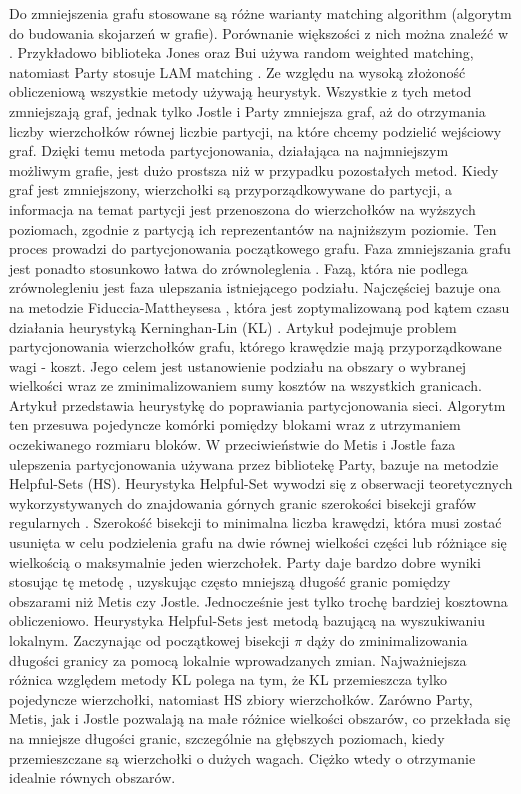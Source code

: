 Do zmniejszenia grafu stosowane są różne warianty matching algorithm (algorytm do budowania skojarzeń w grafie).
Porównanie większości z nich można znaleźć w \cite{Analysis}.
Przykładowo biblioteka Jones oraz Bui \cite{Bui1993AHF} używa random weighted matching, natomiast Party \cite{1364754}
stosuje LAM matching \cite{weighted_maching}.
Ze względu na wysoką złożoność obliczeniową wszystkie metody używają heurystyk.
Wszystkie z tych metod zmniejszają graf, jednak tylko Jostle i Party zmniejsza graf,
aż do otrzymania liczby wierzchołków równej liczbie partycji, na które chcemy podzielić wejściowy graf.
Dzięki temu metoda partycjonowania, działająca na najmniejszym możliwym grafie, jest dużo prostsza niż w przypadku pozostałych metod.
Kiedy graf jest zmniejszony, wierzchołki są przyporządkowywane do partycji, a informacja na temat partycji jest przenoszona
do wierzchołków na wyższych poziomach, zgodnie z partycją ich reprezentantów na najniższym poziomie.
Ten proces prowadzi do partycjonowania początkowego grafu.
Faza zmniejszania grafu jest ponadto stosunkowo łatwa do zrównoleglenia \cite{KARYPIS199871}.
Fazą, która nie podlega zrównolegleniu jest faza ulepszania istniejącego podziału.
Najczęściej bazuje ona na metodzie Fiduccia-Mattheysesa \cite{10.5555/800263.809204},
która jest zoptymalizowaną pod kątem czasu działania heurystyką Kerninghan-Lin (KL) \cite{6771089}.
Artykuł \cite{6771089} podejmuje problem partycjonowania wierzchołków grafu, którego krawędzie mają
przyporządkowane wagi - koszt.
Jego celem jest ustanowienie podziału na obszary o wybranej wielkości wraz
ze zminimalizowaniem sumy kosztów na wszystkich granicach.
Artykuł \cite{10.5555/800263.809204} przedstawia heurystykę do poprawiania partycjonowania sieci.
Algorytm ten przesuwa pojedyncze komórki pomiędzy blokami wraz z utrzymaniem oczekiwanego rozmiaru bloków.
W przeciwieństwie do Metis i Jostle faza ulepszenia partycjonowania używana przez bibliotekę Party, bazuje na metodzie
Helpful-Sets (HS).
Heurystyka Helpful-Set wywodzi się z obserwacji teoretycznych wykorzystywanych do znajdowania górnych
granic szerokości bisekcji grafów regularnych \cite{10.1007/3-540-54345-7_64, MONIEN2006475}.
Szerokość bisekcji to minimalna liczba krawędzi, która musi zostać usunięta w celu podzielenia grafu na
dwie równej wielkości części lub różniące się wielkością o maksymalnie jeden wierzchołek.
Party daje bardzo dobre wyniki stosując tę metodę \cite{10.1007/3-540-44842-X_6}, uzyskując często mniejszą długość
granic pomiędzy obszarami niż Metis czy Jostle.
Jednocześnie jest tylko trochę bardziej kosztowna obliczeniowo.
Heurystyka Helpful-Sets jest metodą bazującą na wyszukiwaniu lokalnym.
Zaczynając od początkowej bisekcji \(\pi\) dąży
do zminimalizowania długości granicy za pomocą lokalnie wprowadzanych zmian.
Najważniejsza różnica względem metody KL polega na tym, że KL przemieszcza tylko pojedyncze wierzchołki,
natomiast HS zbiory wierzchołków.
Zarówno Party, Metis, jak i Jostle pozwalają na małe różnice wielkości obszarów, co przekłada się na
mniejsze długości granic,
szczególnie na głębszych poziomach, kiedy przemieszczane są wierzchołki o dużych wagach.
Ciężko wtedy o otrzymanie idealnie równych obszarów.

